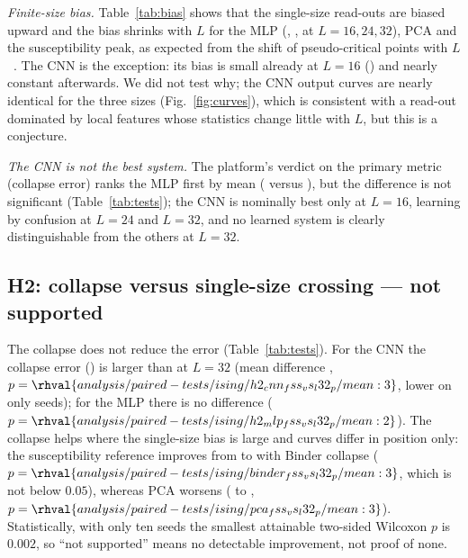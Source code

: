 \emph{Finite-size bias.} Table~\ref{tab:bias} shows that the single-size read-outs are biased upward and the bias shrinks with $L$ for the MLP (, ,  at $L=16,24,32$), PCA and the susceptibility peak, as expected from the shift of pseudo-critical points with $L$~\cite{fisher1972scaling}. The CNN is the exception: its bias is small already at $L=16$ () and nearly constant afterwards. We did not test why; the CNN output curves are nearly identical for the three sizes (Fig.~\ref{fig:curves}), which is consistent with a read-out dominated by local features whose statistics change little with $L$, but this is a conjecture.

\emph{The CNN is not the best system.} The platform's verdict on the primary metric (collapse error) ranks the MLP first by mean ( versus ), but the difference is not significant (Table~\ref{tab:tests}); the CNN is nominally best only at $L=16$, learning by confusion at $L=24$ and $L=32$, and no learned system is clearly distinguishable from the others at $L=32$.

\subsection{H2: collapse versus single-size crossing --- not supported}
The collapse does not reduce the error (Table~\ref{tab:tests}). For the CNN the collapse error () is larger than at $L=32$ (mean difference , $p=\rhval{analysis/paired-tests/ising/h2_cnn_fss_vs_l32_p/mean:3}$, lower on only  seeds); for the MLP there is no difference ($p=\rhval{analysis/paired-tests/ising/h2_mlp_fss_vs_l32_p/mean:2}$). The collapse helps where the single-size bias is large and curves differ in position only: the susceptibility reference improves from  to  with Binder collapse ($p=\rhval{analysis/paired-tests/ising/binder_fss_vs_l32_p/mean:3}$, which is not below $0.05$), whereas PCA worsens ( to , $p=\rhval{analysis/paired-tests/ising/pca_fss_vs_l32_p/mean:3}$). Statistically, with only ten seeds the smallest attainable two-sided Wilcoxon $p$ is $0.002$, so ``not supported'' means no detectable improvement, not proof of none.

